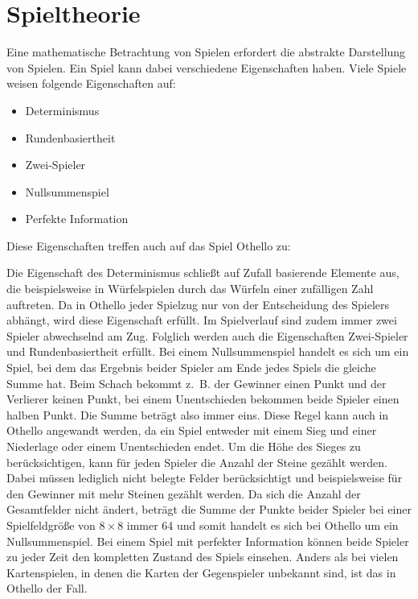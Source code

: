 \section{Spieltheorie}

Eine mathematische Betrachtung von Spielen erfordert die abstrakte Darstellung von Spielen. Ein Spiel kann dabei
verschiedene Eigenschaften haben. Viele Spiele weisen folgende Eigenschaften auf:

\begin{itemize}
    \item Determinismus
    \item Rundenbasiertheit
    \item Zwei-Spieler
    \item Nullsummenspiel
    \item Perfekte Information
\end{itemize}

Diese Eigenschaften treffen auch auf das Spiel Othello zu:

Die Eigenschaft des Determinismus schließt auf Zufall basierende Elemente aus, die beispielsweise in Würfelspielen durch
das Würfeln einer zufälligen Zahl auftreten. Da in Othello jeder Spielzug nur von der Entscheidung des Spielers abhängt,
wird diese Eigenschaft erfüllt. Im Spielverlauf sind zudem immer zwei Spieler abwechselnd am Zug. Folglich werden auch
die Eigenschaften Zwei-Spieler und Rundenbasiertheit erfüllt. Bei einem Nullsummenspiel handelt es sich um ein
Spiel, bei dem das Ergebnis beider Spieler am Ende jedes Spiels die gleiche Summe hat. Beim Schach bekommt z. B. der
Gewinner einen Punkt und der Verlierer keinen Punkt, bei einem Unentschieden bekommen beide Spieler einen halben Punkt.
Die Summe beträgt also immer eins. Diese Regel kann auch in Othello angewandt werden, da ein Spiel entweder mit einem
Sieg und einer Niederlage oder einem Unentschieden endet. Um die Höhe des Sieges zu berücksichtigen, kann für jeden
Spieler die Anzahl der Steine gezählt werden. Dabei müssen lediglich nicht belegte Felder berücksichtigt und
beispielsweise für den Gewinner mit mehr Steinen gezählt werden. Da sich die Anzahl der Gesamtfelder nicht ändert,
beträgt die Summe der Punkte beider Spieler bei einer Spielfeldgröße von $8\times 8$ immer 64 und somit handelt es sich
bei Othello um ein Nullsummenspiel. Bei einem Spiel mit perfekter Information können beide Spieler zu jeder Zeit den
kompletten Zustand des Spiels einsehen. Anders als bei vielen Kartenspielen, in denen die Karten der
Gegenspieler unbekannt sind, ist das in Othello der Fall.
\cite[S.~161f.]{ai2010russel}

